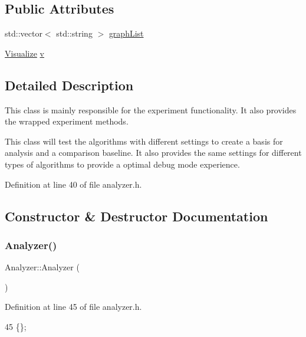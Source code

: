 \subsection*{Public Attributes}
\begin{DoxyCompactItemize}
\item 
std\+::vector$<$ std\+::string $>$ \hyperlink{class_analyzer_a567b5d8b2bbdde28b489834c1644446e}{graph\+List}
\item 
\hyperlink{class_visualize}{Visualize} \hyperlink{class_analyzer_ae32079d0816589617a0c76b1d4cf881b}{v}
\end{DoxyCompactItemize}


\subsection{Detailed Description}
This class is mainly responsible for the experiment functionality. It also provides the wrapped experiment methods. 

This class will test the algorithms with different settings to create a basis for analysis and a comparison baseline. It also provides the same settings for different types of algorithms to provide a optimal debug mode experience. 

Definition at line 40 of file analyzer.\+h.



\subsection{Constructor \& Destructor Documentation}
\mbox{\label{class_analyzer_a1be2ff17bba265bdef6e1b44748eaf96}} 
\subsubsection{\texorpdfstring{Analyzer()}{Analyzer()}\hspace{0.1cm}{\footnotesize\ttfamily [1/2]}}
{\footnotesize\ttfamily Analyzer\+::\+Analyzer (\begin{DoxyParamCaption}{ }\end{DoxyParamCaption})\hspace{0.3cm}{\ttfamily [inline]}}



Definition at line 45 of file analyzer.\+h.


\begin{DoxyCode}
45 \{\};
\end{DoxyCode}
\mbox{\label{class_analyzer_a2aed8194a48a8385ef271af3bd6fdd42}} 

